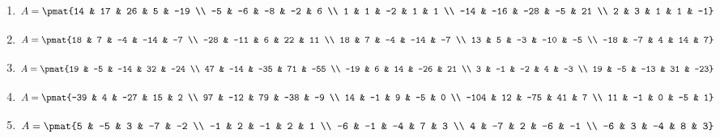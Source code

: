 \begin{enumerate}
\item

\begin{align*}
A = \pmat{14 & 17 & 26 & 5 & -19 \\ -5 & -6 & -8 & -2 & 6 \\ 1 & 1 & -2 & 1 & 1 \\ -14 & -16 & -28 & -5 & 21 \\ 2 & 3 & 1 & 1 & -1}
\end{align*}

\item

\begin{align*}
A = \pmat{18 & 7 & -4 & -14 & -7 \\ -28 & -11 & 6 & 22 & 11 \\ 18 & 7 & -4 & -14 & -7 \\ 13 & 5 & -3 & -10 & -5 \\ -18 & -7 & 4 & 14 & 7}
\end{align*}

\item

\begin{align*}
A = \pmat{19 & -5 & -14 & 32 & -24 \\ 47 & -14 & -35 & 71 & -55 \\ -19 & 6 & 14 & -26 & 21 \\ 3 & -1 & -2 & 4 & -3 \\ 19 & -5 & -13 & 31 & -23}
\end{align*}

\item

\begin{align*}
A = \pmat{-39 & 4 & -27 & 15 & 2 \\ 97 & -12 & 79 & -38 & -9 \\ 14 & -1 & 9 & -5 & 0 \\ -104 & 12 & -75 & 41 & 7 \\ 11 & -1 & 0 & -5 & 1}
\end{align*}

\item

\begin{align*}
A = \pmat{5 & -5 & 3 & -7 & -2 \\ -1 & 2 & -1 & 2 & 1 \\ -6 & -1 & -4 & 7 & 3 \\ 4 & -7 & 2 & -6 & -1 \\ -6 & 3 & -4 & 8 & 3}
\end{align*}


\end{enumerate}
